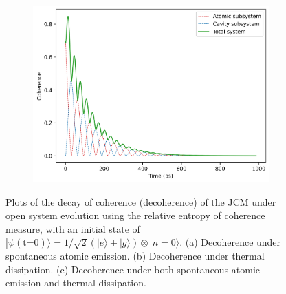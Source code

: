 \documentclass[11pt]{article}
\begin{document}
\begin{figure}[H]
    \begin{subfigure}{0.45\textwidth}
        \centering
        \includegraphics[width=0.85\linewidth]{Research Project/Code/results/JCM/OQS_Coh_Both_eg.png}
        \caption{}
        \label{fig:JCM_OQS_Coh_Both_eg}
    \end{subfigure}
    \hfill
    \caption{Plots of the decay of coherence (decoherence) of the JCM under open system evolution using the relative entropy of coherence measure, with an initial state of $|\psi (\text{t=0})\rangle = 1/\sqrt{2}(|e\rangle + |g\rangle)\otimes|n=0\rangle$. (a) Decoherence under spontaneous atomic emission. (b) Decoherence under thermal dissipation. (c) Decoherence under both spontaneous atomic emission and thermal dissipation.}
    \label{fig:JCM_OQS_Coh_eg}
\end{figure}
\end{document}
